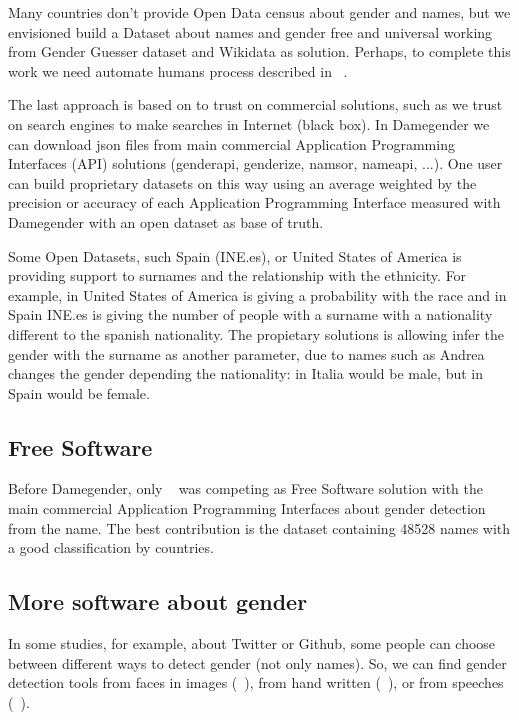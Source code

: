 \documentclass[a4paper]{article}
\begin{document}
Many countries don't provide Open Data census about gender and names,
but we envisioned build a Dataset about names and gender free and
universal working from Gender Guesser dataset and Wikidata as
solution. Perhaps, to complete this work we need automate humans
process described in ~\cite{10.7717/peerj-cs.156}.

The last approach is based on to trust on commercial solutions, such
as we trust on search engines to make searches in Internet (black
box).  In Damegender we can download json files from main commercial
Application Programming Interfaces (API) solutions (genderapi,
genderize, namsor, nameapi, ...). One user can build proprietary
datasets on this way using an average weighted by the precision or
accuracy of each Application Programming Interface measured with
Damegender with an open dataset as base of truth.

Some Open Datasets, such Spain (INE.es), or United States of America
is providing support to surnames and the relationship with the
ethnicity. For example, in United States of America is giving a
probability with the race and in Spain INE.es is giving the number of
people with a surname with a nationality different to the spanish
nationality. The propietary solutions is allowing infer the gender
with the surname as another parameter, due to names such as Andrea
changes the gender depending the nationality: in Italia would be male,
but in Spain would be female.

\subsection{Free Software}

Before Damegender, only ~\cite{krawetz2006gender} was competing as
Free Software solution with the main commercial Application
Programming Interfaces about gender detection from the name. The best
contribution is the dataset containing 48528 names with a good
classification by countries.

\subsection{More software about gender}

In some studies, for example, about Twitter or Github, some people can
choose between different ways to detect gender (not only names). So,
we can find gender detection tools from faces in images
(~\cite{ranjan2017hyperface}), from hand written
(~\cite{liwicki2011automatic}), or from speeches
(~\cite{koppel2002automatically}).
\end{document}
